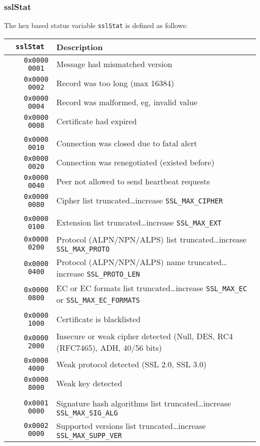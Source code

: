 \documentclass[documentation]{subfiles}
\begin{document}
\subsubsection{sslStat}\label{sslStat}
The hex based status variable {\tt sslStat} is defined as follows:
\begin{longtable}{>{\tt}rl}
    \toprule
    {\bf sslStat} & {\bf Description} \\
    \midrule\endhead%
    0x0000 0001 & Message had mismatched version\\
    0x0000 0002 & Record was too long (max 16384)\\
    0x0000 0004 & Record was malformed, eg, invalid value\\
    0x0000 0008 & Certificate had expired\\
    \\
    0x0000 0010 & Connection was closed due to fatal alert\\
    0x0000 0020 & Connection was renegotiated (existed before)\\
    0x0000 0040 & Peer not allowed to send heartbeat requests\\
    0x0000 0080 & Cipher list truncated\ldots increase {\tt SSL\_MAX\_CIPHER}\\
    \\
    0x0000 0100 & Extension list truncated\ldots increase {\tt SSL\_MAX\_EXT}\\
    0x0000 0200 & Protocol (ALPN/NPN/ALPS) list truncated\ldots increase {\tt SSL\_MAX\_PROTO}\\
    0x0000 0400 & Protocol (ALPN/NPN/ALPS) name truncated\ldots increase {\tt SSL\_PROTO\_LEN}\\
    0x0000 0800 & EC or EC formats list truncated\ldots increase {\tt SSL\_MAX\_EC} or {\tt SSL\_MAX\_EC\_FORMATS}\\
    \\
    0x0000 1000 & Certificate is blacklisted\\
    0x0000 2000 & Insecure or weak cipher detected (Null, DES, RC4 (RFC7465), ADH, 40/56 bits)\\
    0x0000 4000 & Weak protocol detected (SSL 2.0, SSL 3.0)\\
    0x0000 8000 & Weak key detected\\
    \\
    0x0001 0000 & Signature hash algorithms list truncated\ldots increase {\tt SSL\_MAX\_SIG\_ALG}\\
    0x0002 0000 & Supported versions list truncated\ldots increase {\tt SSL\_MAX\_SUPP\_VER}\\

\end{longtable}
\end{document}
